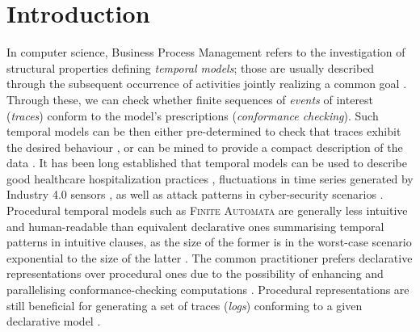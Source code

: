 \documentclass[acmengage]{acmart}
\begin{document}


\maketitle



\section{Introduction} 
In computer science, Business Process Management refers to the investigation of structural properties defining \textit{temporal models}; those are usually described through the subsequent occurrence of activities jointly realizing a common goal \cite{DBLP:books/sp/Weske19}.  Through these, we can check whether finite sequences of \textit{events} of interest (\textit{traces}) conform to the model's prescriptions (\textit{conformance checking}). Such temporal models can be then either pre-determined to check that traces exhibit the desired behaviour \cite{info14030173}, or can be mined to provide a compact description of the data \cite{DBLP:conf/ideas/ApplebyBM23}. It has been long established that temporal models can be used to describe good healthcare hospitalization practices \cite{Xu2020}, fluctuations in time series generated by Industry 4.0 sensors \cite{j.eswa.2022.117176}, as well as attack patterns in cyber-security scenarios \cite{info14030173}. Procedural temporal models such as \textsc{Finite Automata} are generally less intuitive and human-readable than equivalent declarative ones summarising temporal patterns in intuitive clauses, as the size of the former is in the worst-case scenario exponential to the size of the latter \cite{ltlfnfa}. The common practitioner prefers declarative representations over procedural ones due to the possibility of enhancing and parallelising conformance-checking computations \cite{info14030173}. Procedural representations are still beneficial for generating a set of traces (\textit{logs}) conforming to a given declarative model  \cite{DBLP:conf/caise/CiccioBCM15}. 
\end{document}
